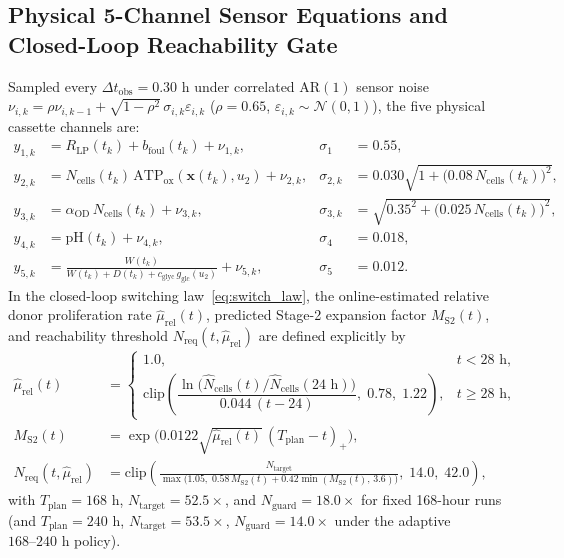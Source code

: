 \documentclass[11pt]{article}
\theoremstyle{plain}
\theoremstyle{remark}
\begin{document}
\subsection{Physical 5-Channel Sensor Equations and Closed-Loop Reachability Gate}
\label{app:ekf}
Sampled every $\Delta t_{\mathrm{obs}} = 0.30\text{ h}$ under correlated $\mathrm{AR}(1)$ sensor noise $\nu_{i,k} = \rho\nu_{i,k-1} + \sqrt{1 - \rho^2}\,\sigma_{i,k}\varepsilon_{i,k}$ ($\rho = 0.65$, $\varepsilon_{i,k} \sim \mathcal{N}(0, 1)$), the five physical cassette channels are:
\begin{subequations}
\begin{align}
  y_{1,k} &= R_{\mathrm{LP}}(t_k) + b_{\mathrm{foul}}(t_k) + \nu_{1,k}, & \sigma_1 &= 0.55, \\
  y_{2,k} &= N_{\mathrm{cells}}(t_k)\,\mathrm{ATP}_{\mathrm{ox}}(\mathbf{x}(t_k), u_2) + \nu_{2,k}, & \sigma_{2,k} &= 0.030\sqrt{1 + \big(0.08\,N_{\mathrm{cells}}(t_k)\big)^2}, \\
  y_{3,k} &= \alpha_{\mathrm{OD}}\,N_{\mathrm{cells}}(t_k) + \nu_{3,k}, & \sigma_{3,k} &= \sqrt{0.35^2 + \big(0.025\,N_{\mathrm{cells}}(t_k)\big)^2}, \\
  y_{4,k} &= \mathrm{pH}(t_k) + \nu_{4,k}, & \sigma_4 &= 0.018, \\
  y_{5,k} &= \frac{W(t_k)}{W(t_k) + D(t_k) + c_{\mathrm{glyc}}\,g_{\mathrm{glc}}(u_2)} + \nu_{5,k}, & \sigma_5 &= 0.012.
\end{align}
\end{subequations}
In the closed-loop switching law~\eqref{eq:switch_law}, the online-estimated relative donor proliferation rate $\hat{\mu}_{\mathrm{rel}}(t)$, predicted Stage-2 expansion factor $M_{\mathrm{S2}}(t)$, and reachability threshold $N_{\mathrm{req}}(t, \hat{\mu}_{\mathrm{rel}})$ are defined explicitly by
\begin{align}
  \hat{\mu}_{\mathrm{rel}}(t) &= \begin{cases}
    1.0, & t < 28\text{ h}, \\[4pt]
    \mathrm{clip}\!\left(\dfrac{\ln\!\big(\hat{N}_{\mathrm{cells}}(t)/\hat{N}_{\mathrm{cells}}(24\text{ h})\big)}{0.044\,(t - 24)},\; 0.78,\; 1.22\right), & t \ge 28\text{ h},
  \end{cases} \\
  M_{\mathrm{S2}}(t) &= \exp\!\Big(0.0122\sqrt{\hat{\mu}_{\mathrm{rel}}(t)}\,(T_{\mathrm{plan}} - t)_+\Big), \\
  N_{\mathrm{req}}(t, \hat{\mu}_{\mathrm{rel}}) &= \mathrm{clip}\!\left(\frac{N_{\mathrm{target}}}{\max\!\big(1.05,\; 0.58\,M_{\mathrm{S2}}(t) + 0.42\min(M_{\mathrm{S2}}(t),\, 3.6)\big)},\; 14.0,\; 42.0\right),
\end{align}
with $T_{\mathrm{plan}} = 168\text{ h}$, $N_{\mathrm{target}} = 52.5\times$, and $N_{\mathrm{guard}} = 18.0\times$ for fixed 168-hour runs (and $T_{\mathrm{plan}} = 240\text{ h}$, $N_{\mathrm{target}} = 53.5\times$, $N_{\mathrm{guard}} = 14.0\times$ under the adaptive $168\text{--}240\text{ h}$ policy).
\end{document}
